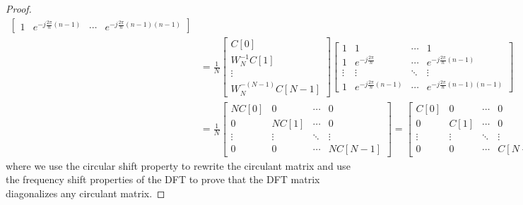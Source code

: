 \documentclass{article}
\begin{document}
\begin{proof}
\begin{align}
\begin{bmatrix}
            1 & e^{-j \frac{2\pi}{n} (n - 1)} & \cdots & e^{-j \frac{2\pi}{n} (n - 1) (n - 1)}
        \end{bmatrix} \\
        &=
        \frac{1}{N} \begin{bmatrix}
            C[0] \\
            W_N^{-1} C[1] \\
            \vdots \\
            W_N^{-(N - 1)} C[N - 1]
        \end{bmatrix}
        \begin{bmatrix}
            1 & 1 & \cdots & 1 \\
            1 & e^{-j \frac{2\pi}{n}} & \cdots & e^{-j \frac{2\pi}{n} (n - 1)} \\
            \vdots & \vdots & \ddots & \vdots \\
            1 & e^{-j \frac{2\pi}{n} (n - 1)} & \cdots & e^{-j \frac{2\pi}{n} (n - 1) (n - 1)}
        \end{bmatrix} \\
        &=
        \frac{1}{N} \begin{bmatrix}
            N C[0] & 0 & \cdots & 0 \\
            0 & N C[1] & \cdots & 0 \\
            \vdots & \vdots & \ddots & \vdots \\
            0 & 0 & \cdots & N C[N - 1]
        \end{bmatrix}
        =
        \begin{bmatrix}
            C[0] & 0 & \cdots & 0 \\
            0 & C[1] & \cdots & 0 \\
            \vdots & \vdots & \ddots & \vdots \\
            0 & 0 & \cdots & C[N - 1]
        \end{bmatrix}
    \end{align}
    where we use the circular shift property to rewrite the circulant matrix and use the frequency shift properties of the DFT to prove that the DFT matrix diagonalizes any circulant matrix.
\end{proof}

\end{document}
